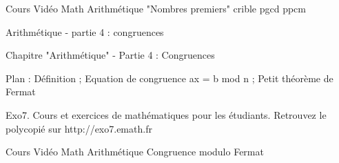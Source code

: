 Cours Vidéo Math Arithmétique "Nombres premiers" crible pgcd ppcm





Arithmétique - partie 4 : congruences



Chapitre "Arithmétique" - Partie 4 : Congruences

Plan : Définition ; Equation de congruence ax = b mod n ;
Petit théorème de Fermat

Exo7. Cours et exercices de mathématiques pour les étudiants.
Retrouvez le polycopié sur http://exo7.emath.fr


Cours Vidéo Math Arithmétique Congruence modulo Fermat



